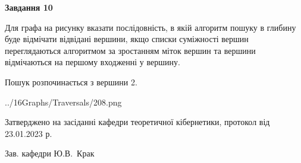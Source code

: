 \documentclass[12pt, ukrainian]{article}
\begin{document}
{\begin {large}
{\begin {center}\textbf{Завдання 10}\end {center}}\par
Для графа на рисунку вказати послідовність, в якій алгоритм пошуку в глибину буде відмічати відвідані вершини, якщо списки суміжності вершин переглядаються алгоритмом за зростанням міток вершин та вершини відмічаються на першому вход\-женні у вершину.\par
Пошук розпочинається з вершини 2.\par

\begin{center}
	{../16Graphs/Traversals/208.png}
\end{center}\par
\newpage


\end {large}
}
{\smallskip \begin {small} Затверджено на засіданні кафедри теоретичної кібернетики, протокол  від   23.01.2023 р.\par\smallskip\smallskip
{\parbox {6.5 cm}{Зав. кафедри \dotfill Ю.В.~Крак}} \end{small}}
\end{document}
